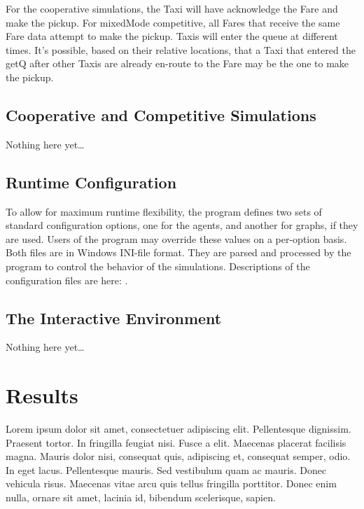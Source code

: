 \documentclass[11pt,letterpaper,onecolumn,twoside,openright,final]{report}
\begin{document}
For the cooperative simulations, the Taxi will have acknowledge the Fare and make the pickup.
For mixedMode competitive, all Fares that receive the same Fare data attempt to make the pickup.
Taxis will enter the queue at different times.
It's possible, based on their relative locations, that a Taxi that entered the getQ after other Taxis are already en-route to the Fare may be the one to make the pickup.

\section{Cooperative and Competitive Simulations}
Nothing here yet\ldots

\section{Runtime Configuration}
To allow for maximum runtime flexibility, the program defines two sets of standard configuration options, one for the agents, and another for graphs, if they are used.
Users of the program may override these values on a per-option basis.
Both files are in Windows INI-file format.
They are parsed and processed by the program to control the behavior of the simulations.
Descriptions of the configuration files are here: .

\section{The Interactive Environment}
Nothing here yet\ldots


\chapter{Results}
Lorem ipsum dolor sit amet, consectetuer adipiscing elit. Pellentesque dignissim.
Praesent tortor.
In fringilla feugiat nisi.
Fusce a elit.
Maecenas placerat facilisis magna.
Mauris dolor nisi, consequat quis, adipiscing et, consequat semper, odio.
In eget lacus.
Pellentesque mauris.
Sed vestibulum quam ac mauris.
Donec vehicula risus.
Maecenas vitae arcu quis tellus fringilla porttitor.
Donec enim nulla, ornare sit amet, lacinia id, bibendum scelerisque, sapien.
\end{document}
